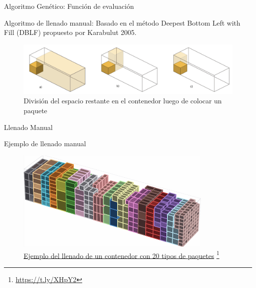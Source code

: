 \documentclass[handout]{beamer}
\begin{document}
\begin{frame}{Algoritmo Genético: Función de evaluación}
    \begin{exampleblock}{Algoritmo de llenado manual:}
        Basado en el método Deepest Bottom Left with Fill (DBLF) propuesto por Karabulut 2005.
        \begin{figure}
            \centering
            \includegraphics[width=1\textwidth]{pic/dblf.png}
            \caption*{División del espacio restante en el contenedor luego de colocar un paquete}
            \label{fig:dblf}
        \end{figure}
    \end{exampleblock}
\end{frame}


\begin{frame}{Llenado Manual}
    \begin{exampleblock}{Ejemplo de llenado manual}
        \begin{figure}
            \centering
            \includegraphics[width=0.85\textwidth]{pic/contenedor-lleno.png}
            \caption*{\href{https://raw.githubusercontent.com/josegustavo/lcp/main/lcp/presentation/pic/lcp.gif}{Ejemplo del llenado de un contenedor con 20 tipos de paquetes} \footnote{\href{https://t.ly/XHpY2}{\small https://t.ly/XHpY2}}}
            \label{fig:contenedor-lleno}
        \end{figure}
    \end{exampleblock}
\end{frame}
\end{document}
